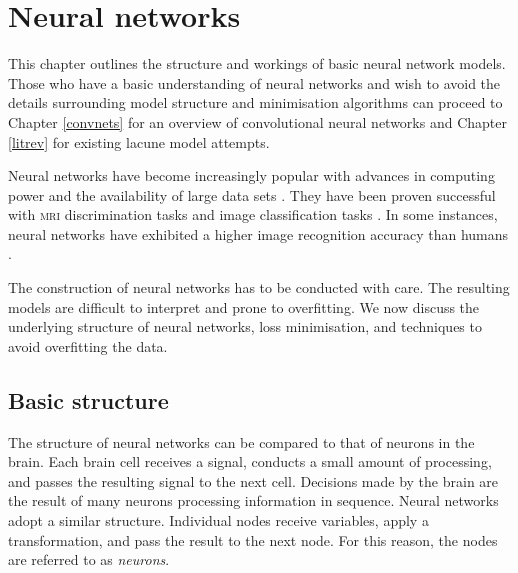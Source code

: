 %
%

\chapter{Neural networks}\label{neuralNets-intro}

This chapter outlines the structure and workings of basic neural network models. Those who have a basic understanding of neural networks and wish to avoid the details surrounding model structure and minimisation algorithms can proceed to Chapter \ref{convnets} for an overview of convolutional neural networks and Chapter \ref{litrev} for existing lacune model attempts.

% 
% 

Neural networks have become increasingly popular with advances in computing power and the availability of large data sets \cite{Goodfellow-et-al-2016}. They have been proven successful with \textsc{mri} discrimination tasks \cite{DouQ.2016ADoC, Yokoyama2007} and image classification tasks \cite{AlexNet2012, GoogLeNet2015, HeKaiming2015DDiR}. In some instances, neural networks have exhibited a higher image recognition accuracy than humans \cite{HeKaiming2015DDiR}.

The construction of neural networks has to be conducted with care. The resulting models are difficult to interpret and prone to overfitting. We now discuss the underlying structure of neural networks, loss minimisation, and techniques to avoid overfitting the data.

\section{Basic structure}\label{nnets-structure}

The structure of neural networks can be compared to that of neurons in the brain. Each brain cell receives a signal, conducts a small amount of processing, and passes the resulting signal to the next cell. Decisions made by the brain are the result of many neurons processing information in sequence. Neural networks adopt a similar structure. Individual nodes receive variables, apply a transformation, and pass the result to the next node. For this reason, the nodes are referred to as \textit{neurons}.


